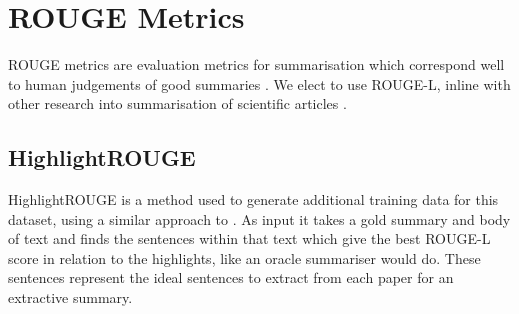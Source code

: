 \documentclass[11pt,a4paper]{article}
\begin{document}




\section{ROUGE Metrics}\label{sec:ROUGE}

ROUGE metrics are evaluation metrics for summarisation which correspond well to human judgements of good summaries \citep{Lin2004}. We elect to use ROUGE-L, inline with other research into summarisation of scientific articles \citep{used_rouge_l_Cohan2015, dataJaidka2016}.


\subsection{HighlightROUGE}
\label{sec:highlight_rouge}
HighlightROUGE is a method %
used to generate additional training data for this dataset, using a similar approach to \cite{hermann2015teaching}. As input it takes a gold summary and body of text
and finds the sentences within that text which give the best ROUGE-L 
score in relation to the highlights, like an oracle summariser would do. These sentences represent the ideal sentences to extract from each paper for an extractive summary.
\end{document}
